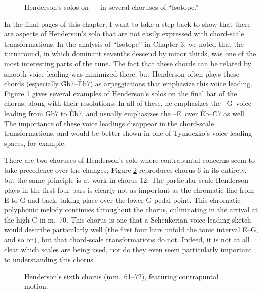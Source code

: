 \begin{figure}[tbp]
  \caption[Henderson's solos on
    \protect\h{Gb7}--\protect\h{Eb7}--\protect\h{C7} in several choruses of
    ``Isotope.'']{Henderson's solos on
    \protect{}--\protect{}--\protect{} in several
    choruses of ``Isotope.''}
  \label{csa:henderson-turnarounds}
\end{figure}

In the final pages of this chapter, I want to take a step back to show that
there are aspects of Henderson's solo that are not easily expressed with
chord-scale transformations. In the analysis of ``Isotope'' in Chapter 3, we
noted that the turnaround, in which dominant sevenths descend by minor thirds,
was one of the most interesting parts of the tune. The fact that these chords
can be related by smooth voice leading was minimized there, but Henderson
often plays these chords (especially \h{Gb7}--\h{Eb7}) as arpeggiations that
emphasize this voice leading. Figure \ref{csa:henderson-turnarounds} gives
several examples of Henderson's solos on the final bar of the chorus, along
with their resolutions. In all of these, he emphasizes the \Gflat--G\nat\ voice
leading from \h{Gb7} to \h{Eb7}, and usually emphasizes the \Eflat--E\nat\ over
\h{Eb}--\h{C7} as well. The importance of these voice leadings disappear in
the chord-scale transformations, and would be better shown in one of
Tymoczko's voice-leading spaces, for example.

There are two choruses of Henderson's solo where contrapuntal concerns seem to
take precedence over the changes; Figure \ref{csa:contrapuntal-chorus}
reproduces chorus 6 in its entirety, but the same principle is at work in
chorus 12. The particular scale Henderson plays in the first four bars is
clearly not as important as the chromatic line from E to G and back, taking
place over the lower G pedal point. This chromatic polyphonic
melody continues throughout the chorus, culminating in the arrival at the high
C in m.~70. This chorus is one that a Schenkerian voice-leading sketch would
describe particularly well (the first four bars unfold the tonic interval
E--G, and so on), but that chord-scale transformations do not.
Indeed, it is not at all clear which scales are being used, nor do they even
seem particularly important to understanding this chorus.

\begin{figure}[tbp]
  \caption[Henderson's sixth chorus, featuring contrapuntal motion.]{%
    Henderson's sixth chorus (mm.~61--72), featuring contrapuntal motion.}
  \label{csa:contrapuntal-chorus}
\end{figure}

